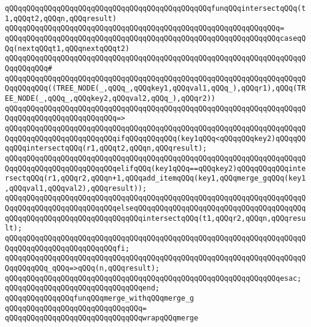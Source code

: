 \verb|qQQqqQQqqQQqqQQqqQQqqQQqqQQqqQQqqQQqqQQqqQQqqQQqfunqQQqintersectqQQq(t1,qQQqt2,qQQqn,qQQqresult)|\newline
\verb|qQQqqQQqqQQqqQQqqQQqqQQqqQQqqQQqqQQqqQQqqQQqqQQqqQQqqQQqqQQqqQQq=|\newline
\verb|qQQqqQQqqQQqqQQqqQQqqQQqqQQqqQQqqQQqqQQqqQQqqQQqqQQqqQQqqQQqqQQqcaseqQQq(nextqQQqt1,qQQqnextqQQqt2)|\newline
\verb|qQQqqQQqqQQqqQQqqQQqqQQqqQQqqQQqqQQqqQQqqQQqqQQqqQQqqQQqqQQqqQQqqQQqqQQqqQQqqQQq#|\newline
\verb|qQQqqQQqqQQqqQQqqQQqqQQqqQQqqQQqqQQqqQQqqQQqqQQqqQQqqQQqqQQqqQQqqQQqqQQqqQQqqQQq((TREE_NODE(_,qQQq_,qQQqkey1,qQQqval1,qQQq_),qQQqr1),qQQq(TREE_NODE(_,qQQq_,qQQqkey2,qQQqval2,qQQq_),qQQqr2))|\newline
\verb|qQQqqQQqqQQqqQQqqQQqqQQqqQQqqQQqqQQqqQQqqQQqqQQqqQQqqQQqqQQqqQQqqQQqqQQqqQQqqQQqqQQqqQQqqQQqqQQq=>|\newline
\verb|qQQqqQQqqQQqqQQqqQQqqQQqqQQqqQQqqQQqqQQqqQQqqQQqqQQqqQQqqQQqqQQqqQQqqQQqqQQqqQQqqQQqqQQqqQQqqQQqifqQQqqQQqqQQq(key1qQQq<qQQqqQQqkey2)qQQqqQQqqQQqintersectqQQq(r1,qQQqt2,qQQqn,qQQqresult);|\newline
\verb|qQQqqQQqqQQqqQQqqQQqqQQqqQQqqQQqqQQqqQQqqQQqqQQqqQQqqQQqqQQqqQQqqQQqqQQqqQQqqQQqqQQqqQQqqQQqqQQqelifqQQq(key1qQQq==qQQqkey2)qQQqqQQqqQQqintersectqQQq(r1,qQQqr2,qQQqn+1,qQQqadd_itemqQQq(key1,qQQqmerge_gqQQq(key1,qQQqval1,qQQqval2),qQQqresult));|\newline
\verb|qQQqqQQqqQQqqQQqqQQqqQQqqQQqqQQqqQQqqQQqqQQqqQQqqQQqqQQqqQQqqQQqqQQqqQQqqQQqqQQqqQQqqQQqqQQqqQQqelseqQQqqQQqqQQqqQQqqQQqqQQqqQQqqQQqqQQqqQQqqQQqqQQqqQQqqQQqqQQqqQQqqQQqqQQqintersectqQQq(t1,qQQqr2,qQQqn,qQQqresult);|\newline
\verb|qQQqqQQqqQQqqQQqqQQqqQQqqQQqqQQqqQQqqQQqqQQqqQQqqQQqqQQqqQQqqQQqqQQqqQQqqQQqqQQqqQQqqQQqqQQqqQQqfi;|\newline
\newline
\verb|qQQqqQQqqQQqqQQqqQQqqQQqqQQqqQQqqQQqqQQqqQQqqQQqqQQqqQQqqQQqqQQqqQQqqQQqqQQqqQQq_qQQq=>qQQq(n,qQQqresult);|\newline
\verb|qQQqqQQqqQQqqQQqqQQqqQQqqQQqqQQqqQQqqQQqqQQqqQQqqQQqqQQqqQQqqQQqesac;|\newline
\verb|qQQqqQQqqQQqqQQqqQQqqQQqqQQqqQQqend;|\newline
\newline
\verb|qQQqqQQqqQQqqQQqfunqQQqmerge_withqQQqmerge_g|\newline
\verb|qQQqqQQqqQQqqQQqqQQqqQQqqQQqqQQq=|\newline
\verb|qQQqqQQqqQQqqQQqqQQqqQQqqQQqqQQqwrapqQQqmerge|\newline
